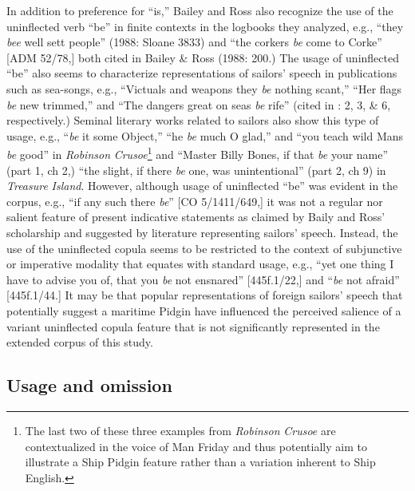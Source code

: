   In addition to preference for “is,” Bailey and Ross also recognize the use of the uninflected verb “be” in finite contexts in the logbooks they analyzed, e.g., “they \textit{bee} well sett people” (1988: Sloane 3833) and “the corkers \textit{be} come to Corke” [ADM 52/78,] both cited in Bailey \& Ross (1988: 200.) The usage of uninflected “be” also seems to characterize representations of sailors’ speech in publications such as sea-songs, e.g., “Victuals and weapons they \textit{be} nothing scant,” “Her flags \textit{be} new trimmed,” and “The dangers great on seas \textit{be} rife” (cited in \citealt{Palmer1986}: 2, 3, \& 6, respectively.) Seminal literary works related to sailors also show this type of usage, e.g., “\textit{be} it some Object,” “he \textit{be} much O glad,” and “you teach wild Mans \textit{be} good” in  \textit{Robinson} \textit{Crusoe}\footnote{The last two of these three examples from \textit{Robinson} \textit{Crusoe} are contextualized in the voice of Man Friday and thus potentially aim to illustrate a Ship Pidgin feature rather than a variation inherent to Ship English.}  and “Master Billy Bones, if that \textit{be} your name” (part 1, ch 2,) “the slight, if there \textit{be} one, was unintentional” (part 2, ch 9) in  \textit{Treasure} \textit{Island}. However, although usage of uninflected “be” was evident in the corpus, e.g., “if any such there \textit{be}” [CO 5/1411/649,] it was not a regular nor salient feature of present indicative statements as claimed by Baily and Ross’ scholarship and suggested by literature representing sailors’ speech. Instead, the use of the uninflected copula seems to be restricted to the context of subjunctive or imperative modality that equates with standard usage, e.g., “yet one thing I have to advise you of, that you \textit{be} not ensnared” [445f.1/22,] and “\textit{be} not afraid” [445f.1/44.] It may be that popular representations of foreign sailors’ speech that potentially suggest a maritime Pidgin have influenced the perceived salience of a variant uninflected copula feature that is not significantly represented in the extended corpus of this study. 

\subsection{\textbf{Usage} \textbf{and} \textbf{omission}  }%

